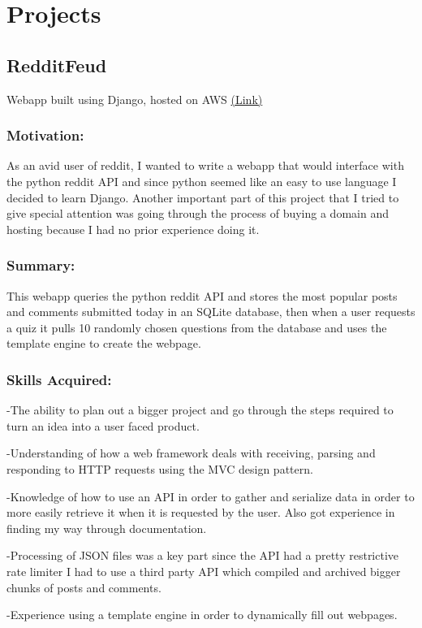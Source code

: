 \documentclass[a4paper,hidelinks,11pt]{article}
\begin{document}
\section{Projects}
\subsection{RedditFeud}
Webapp built using Django, hosted on AWS \href{https:\\www.redditfeud.com}{(Link)}
\subsubsection{Motivation:}
As an avid user of reddit, I wanted to write a webapp that would interface with the python reddit API and
since python seemed like an easy to use language I decided to learn Django. Another important part of this
project that I tried to give special attention was going through the process of buying a domain and hosting
because I had no prior experience doing it.

\subsubsection{Summary:}
This webapp queries the python reddit API and stores the most popular posts and comments submitted today 
in an SQLite database, then when a user requests a quiz it pulls 10 randomly chosen questions from the
database and uses the template engine to create the webpage.
\subsubsection{Skills Acquired:}

-The ability to plan out a bigger project and go through the steps required to turn an idea into a user faced
product.

-Understanding of how a web framework deals with receiving, parsing and responding to HTTP requests using
the MVC design pattern.

-Knowledge of how to use an API in order to gather and serialize data in order to more easily retrieve it
when it is requested by the user. Also got experience in finding my way through documentation.

-Processing of JSON files was a key part since the API had a pretty restrictive rate limiter I had to use a
third party API which compiled and archived bigger chunks of posts and comments.

-Experience using a template engine in order to dynamically fill out webpages.
\end{document}
